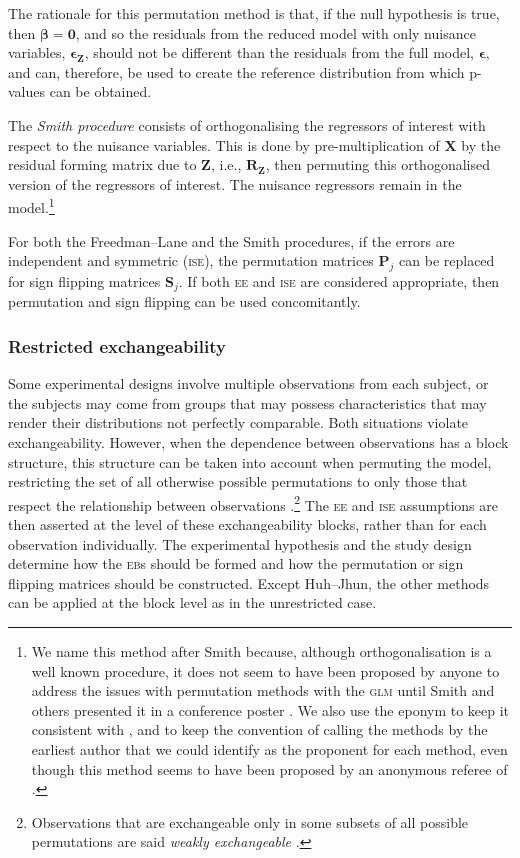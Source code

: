 The rationale for this permutation method is that, if the null hypothesis is true, then $\boldsymbol{\beta}=\mathbf{0}$, and so the residuals from the reduced model with only nuisance variables, $\boldsymbol{\epsilon}_{\mathbf{Z}}$, should not be different than the residuals from the full model, $\boldsymbol{\epsilon}$, and can, therefore, be used to create the reference distribution from which p-values can be obtained.

The \emph{Smith procedure} consists of orthogonalising the regressors of interest with respect to the nuisance variables. This is done by pre-multiplication of $\mathbf{X}$ by the residual forming matrix due to $\mathbf{Z}$, i.e., $\mathbf{R}_{\mathbf{Z}}$, then permuting this orthogonalised version of the regressors of interest. The nuisance regressors remain in the model.\footnote{We name this method after Smith because, although orthogonalisation is a well known procedure, it does not seem to have been proposed by anyone to address the issues with permutation methods with the \textsc{glm} until Smith and others presented it in a conference poster \citep{Nichols2008}. We also use the eponym to keep it consistent with \citet{Ridgway2009}, and to keep the convention of calling the methods by the earliest author that we could identify as the proponent for each method, even though this method seems to have been proposed by an anonymous referee of \citet{OGorman2005}.}

For both the Freedman--Lane and the Smith procedures, if the errors are independent and symmetric (\textsc{ise}), the permutation matrices $\mathbf{P}_{j}$ can be replaced for sign flipping matrices $\mathbf{S}_{j}$. If both \textsc{ee} and \textsc{ise} are considered appropriate, then permutation and sign flipping can be used concomitantly.

\subsubsection{Restricted exchangeability}
\label{sec:perm:restricted}

Some experimental designs involve multiple observations from each subject, or the subjects may come from groups that may possess characteristics that may render their distributions not perfectly comparable. Both situations violate exchangeability. However, when the dependence between observations has a block structure, this structure can be taken into account when permuting the model, restricting the set of all otherwise possible permutations to only those that respect the relationship between observations \citep{Pesarin2001}.\footnote{Observations that are exchangeable only in some subsets of all possible permutations are said \emph{weakly exchangeable} \citep{Good2002}.} The \textsc{ee} and \textsc{ise} assumptions are then asserted at the level of these exchangeability blocks, rather than for each observation individually. The experimental hypothesis and the study design determine how the \textsc{eb}s should be formed and how the permutation or sign flipping matrices should be constructed. Except Huh--Jhun, the other methods can be applied at the block level as in the unrestricted case.


